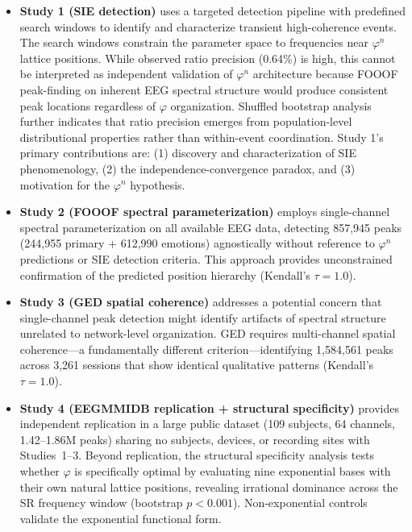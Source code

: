 \documentclass[11pt,a4paper]{article}
\newcommand{\phisym}{\varphi}
\begin{document}
\begin{itemize}
    \item \textbf{Study 1 (SIE detection)} uses a targeted detection pipeline with predefined search windows to identify and characterize transient high-coherence events. The search windows constrain the parameter space to frequencies near $\phisym^n$ lattice positions. While observed ratio precision (0.64\%) is high, this cannot be interpreted as independent validation of $\phisym^n$ architecture because FOOOF peak-finding on inherent EEG spectral structure would produce consistent peak locations regardless of $\phisym$ organization. Shuffled bootstrap analysis further indicates that ratio precision emerges from population-level distributional properties rather than within-event coordination. Study 1's primary contributions are: (1) discovery and characterization of SIE phenomenology, (2) the independence-convergence paradox, and (3) motivation for the $\phisym^n$ hypothesis.

    \item \textbf{Study 2 (FOOOF spectral parameterization)} employs single-channel spectral parameterization on all available EEG data, detecting 857,945 peaks (244,955 primary + 612,990 emotions) agnostically without reference to $\phisym^n$ predictions or SIE detection criteria. This approach provides unconstrained confirmation of the predicted position hierarchy (Kendall's $\tau = 1.0$).

    \item \textbf{Study 3 (GED spatial coherence)} addresses a potential concern that single-channel peak detection might identify artifacts of spectral structure unrelated to network-level organization. GED requires multi-channel spatial coherence---a fundamentally different criterion---identifying 1,584,561 peaks across 3,261 sessions that show identical qualitative patterns (Kendall's $\tau = 1.0$).

    \item \textbf{Study 4 (EEGMMIDB replication + structural specificity)} provides independent replication in a large public dataset (109 subjects, 64 channels, 1.42--1.86M peaks) sharing no subjects, devices, or recording sites with Studies~1--3. Beyond replication, the structural specificity analysis tests whether $\phisym$ is specifically optimal by evaluating nine exponential bases with their own natural lattice positions, revealing irrational dominance across the SR frequency window (bootstrap $p < 0.001$). Non-exponential controls validate the exponential functional form.
\end{itemize}
\end{document}
